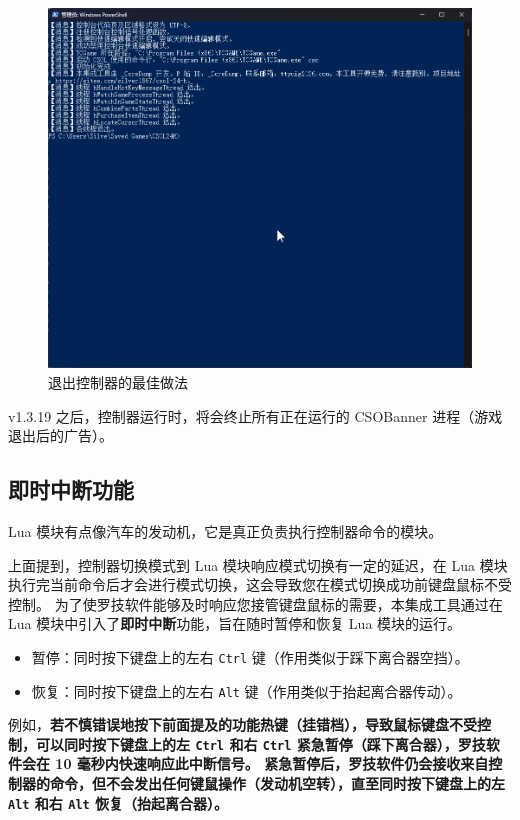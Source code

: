 \begin{figure}[H]
    \Centering
    \includegraphics[width=\textwidth]{docs/assets/intro/exit_controller.png}
    \caption{退出控制器的最佳做法}
\end{figure}

v1.3.19 之后，控制器运行时，将会终止所有正在运行的 CSOBanner 进程（游戏退出后的广告）。

\subsection{即时中断功能}

Lua 模块有点像汽车的发动机，它是真正负责执行控制器命令的模块。

上面提到，控制器切换模式到 Lua 模块响应模式切换有一定的延迟，在 Lua 模块执行完当前命令后才会进行模式切换，这会导致您在模式切换成功前键盘鼠标不受控制。
为了使罗技软件能够及时响应您接管键盘鼠标的需要，本集成工具通过在 Lua 模块中引入了\textbf{即时中断}功能，旨在随时暂停和恢复 Lua 模块的运行。

\begin{itemize}
\item 暂停：同时按下键盘上的左右 \lstinline{Ctrl} 键（作用类似于踩下离合器空挡）。
\item 恢复：同时按下键盘上的左右 \lstinline{Alt} 键（作用类似于抬起离合器传动）。
\end{itemize}

例如，\textbf{\color{red}若不慎错误地按下前面提及的功能热键（挂错档），导致鼠标键盘不受控制，可以同时按下键盘上的左 \lstinline{Ctrl} 和右 \lstinline{Ctrl} 紧急暂停（踩下离合器），罗技软件会在 10 毫秒内快速响应此中断信号。
紧急暂停后，罗技软件仍会接收来自控制器的命令，但不会发出任何键鼠操作（发动机空转），直至同时按下键盘上的左 \lstinline{Alt} 和右 \lstinline{Alt} 恢复（抬起离合器）。}

